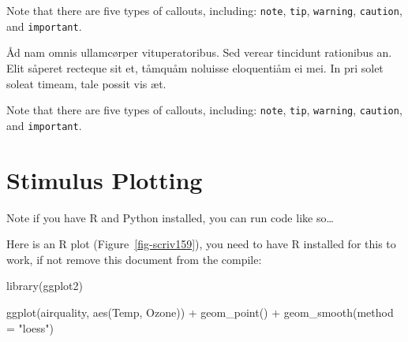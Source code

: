 \documentclass[
  12pt,
  a4paper,
  oneside,
  titlepage,
  toclink=all,
  toc=bibliography]{scrbook}
\newenvironment{Shaded}{\begin{snugshade}}{\end{snugshade}}
\newcommand{\AttributeTok}[1]{\textcolor[rgb]{0.40,0.45,0.13}{#1}}
\newcommand{\FunctionTok}[1]{\textcolor[rgb]{0.28,0.35,0.67}{#1}}
\newcommand{\NormalTok}[1]{\textcolor[rgb]{0.00,0.23,0.31}{#1}}
\newcommand{\SpecialCharTok}[1]{\textcolor[rgb]{0.37,0.37,0.37}{#1}}
\newcommand{\StringTok}[1]{\textcolor[rgb]{0.13,0.47,0.30}{#1}}
\theoremstyle{definition}
\theoremstyle{definition}
\theoremstyle{plain}
\theoremstyle{definition}
\theoremstyle{plain}
\theoremstyle{plain}
\theoremstyle{plain}
\theoremstyle{plain}
\theoremstyle{remark}
\begin{document}
\begin{tcolorbox}[enhanced jigsaw, colbacktitle=quarto-callout-important-color!10!white, arc=.35mm, titlerule=0mm, colframe=quarto-callout-important-color-frame, coltitle=black, leftrule=.75mm, bottomrule=.15mm, opacityback=0, toptitle=1mm, breakable, bottomtitle=1mm, title=\textcolor{quarto-callout-important-color}{\faExclamation}\hspace{0.5em}{Important}, toprule=.15mm, rightrule=.15mm, colback=white, opacitybacktitle=0.6, left=2mm]

Note that there are five types of callouts, including: \texttt{note},
\texttt{tip}, \texttt{warning}, \texttt{caution}, and
\texttt{important}.

\end{tcolorbox}

Åd nam omnis ullamcørper vituperatoribus. Sed verear tincidunt
rationibus an. Elit såperet recteque sit et, tåmquåm noluisse
eloquentiåm ei mei. In pri solet soleat timeam, tale possit vis æt.

\begin{tcolorbox}[enhanced jigsaw, colbacktitle=quarto-callout-note-color!10!white, arc=.35mm, titlerule=0mm, colframe=quarto-callout-note-color-frame, coltitle=black, leftrule=.75mm, bottomrule=.15mm, opacityback=0, toptitle=1mm, breakable, bottomtitle=1mm, title=\textcolor{quarto-callout-note-color}{\faInfo}\hspace{0.5em}{Note}, toprule=.15mm, rightrule=.15mm, colback=white, opacitybacktitle=0.6, left=2mm]

Note that there are five types of callouts, including: \texttt{note},
\texttt{tip}, \texttt{warning}, \texttt{caution}, and
\texttt{important}.

\end{tcolorbox}

\hypertarget{sec-scriv159}{%
\section{Stimulus Plotting}\label{sec-scriv159}}

\protect\hypertarget{scriv159}{}{}

Note if you have R and Python installed, you can run code like
so\ldots{}

Here is an R plot
(\protect\hypertarget{cite_20}{}{\label{cite_20}Figure~\ref{fig-scriv159}}),
you need to have R installed for this to work, if not remove this
document from the compile:

\begin{Shaded}
\begin{Highlighting}[numbers=left,,]
\FunctionTok{library}\NormalTok{(ggplot2)}

\FunctionTok{ggplot}\NormalTok{(airquality, }\FunctionTok{aes}\NormalTok{(Temp, Ozone)) }\SpecialCharTok{+} 
  \FunctionTok{geom\_point}\NormalTok{() }\SpecialCharTok{+} 
  \FunctionTok{geom\_smooth}\NormalTok{(}\AttributeTok{method =} \StringTok{"loess"}\NormalTok{)}
\end{Highlighting}
\end{Shaded}
\end{document}

